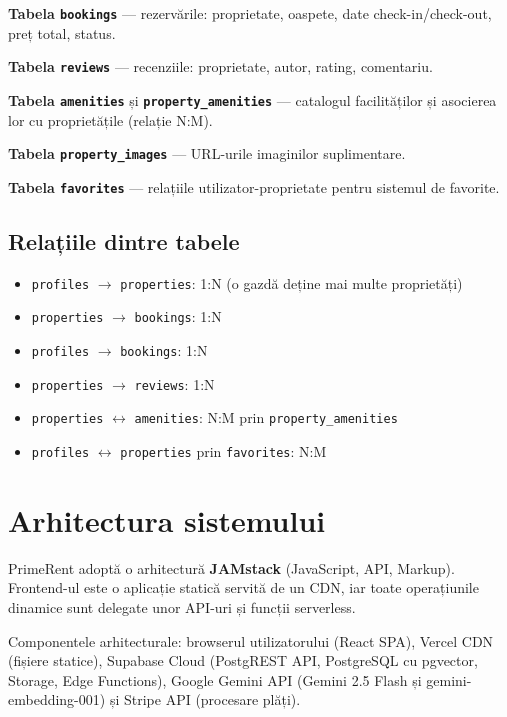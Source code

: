 \documentclass[12pt,a4paper,oneside]{report}
\begin{document}
\textbf{Tabela \texttt{bookings}} — rezervările: proprietate, oaspete, date check-in/check-out, preț total, status.

\textbf{Tabela \texttt{reviews}} — recenziile: proprietate, autor, rating, comentariu.

\textbf{Tabela \texttt{amenities}} și \textbf{\texttt{property\_amenities}} — catalogul facilităților și asocierea lor cu proprietățile (relație N:M).

\textbf{Tabela \texttt{property\_images}} — URL-urile imaginilor suplimentare.

\textbf{Tabela \texttt{favorites}} — relațiile utilizator-proprietate pentru sistemul de favorite.

\subsection{Relațiile dintre tabele}

\begin{itemize}
  \item \texttt{profiles} $\rightarrow$ \texttt{properties}: 1:N (o gazdă deține mai multe proprietăți)
  \item \texttt{properties} $\rightarrow$ \texttt{bookings}: 1:N
  \item \texttt{profiles} $\rightarrow$ \texttt{bookings}: 1:N
  \item \texttt{properties} $\rightarrow$ \texttt{reviews}: 1:N
  \item \texttt{properties} $\leftrightarrow$ \texttt{amenities}: N:M prin \texttt{property\_amenities}
  \item \texttt{profiles} $\leftrightarrow$ \texttt{properties} prin \texttt{favorites}: N:M
\end{itemize}


\section{Arhitectura sistemului}

PrimeRent adoptă o arhitectură \textbf{JAMstack} (JavaScript, API, Markup). Frontend-ul este o aplicație statică servită de un CDN, iar toate operațiunile dinamice sunt delegate unor API-uri și funcții serverless.

Componentele arhitecturale: browserul utilizatorului (React SPA), Vercel CDN (fișiere statice), Supabase Cloud (PostgREST API, PostgreSQL cu pgvector, Storage, Edge Functions), Google Gemini API (Gemini 2.5 Flash și gemini-embedding-001) și Stripe API (procesare plăți).
\end{document}

